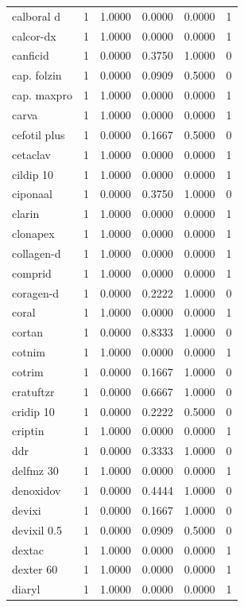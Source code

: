 \begin{longtable}{p{3.0cm}rrrrr}
calboral d & 1 & 1.0000 & 0.0000 & 0.0000 & 1 \\
calcor-dx & 1 & 1.0000 & 0.0000 & 0.0000 & 1 \\
canficid & 1 & 0.0000 & 0.3750 & 1.0000 & 0 \\
cap. folzin & 1 & 0.0000 & 0.0909 & 0.5000 & 0 \\
cap. maxpro & 1 & 1.0000 & 0.0000 & 0.0000 & 1 \\
carva & 1 & 1.0000 & 0.0000 & 0.0000 & 1 \\
cefotil plus & 1 & 0.0000 & 0.1667 & 0.5000 & 0 \\
cetaclav & 1 & 1.0000 & 0.0000 & 0.0000 & 1 \\
cildip 10 & 1 & 1.0000 & 0.0000 & 0.0000 & 1 \\
ciponaal & 1 & 0.0000 & 0.3750 & 1.0000 & 0 \\
clarin & 1 & 1.0000 & 0.0000 & 0.0000 & 1 \\
clonapex & 1 & 1.0000 & 0.0000 & 0.0000 & 1 \\
collagen-d & 1 & 1.0000 & 0.0000 & 0.0000 & 1 \\
comprid & 1 & 1.0000 & 0.0000 & 0.0000 & 1 \\
coragen-d & 1 & 0.0000 & 0.2222 & 1.0000 & 0 \\
coral & 1 & 1.0000 & 0.0000 & 0.0000 & 1 \\
cortan & 1 & 0.0000 & 0.8333 & 1.0000 & 0 \\
cotnim & 1 & 1.0000 & 0.0000 & 0.0000 & 1 \\
cotrim & 1 & 0.0000 & 0.1667 & 1.0000 & 0 \\
cratuftzr & 1 & 0.0000 & 0.6667 & 1.0000 & 0 \\
cridip 10 & 1 & 0.0000 & 0.2222 & 0.5000 & 0 \\
criptin & 1 & 1.0000 & 0.0000 & 0.0000 & 1 \\
ddr & 1 & 0.0000 & 0.3333 & 1.0000 & 0 \\
delfmz 30 & 1 & 1.0000 & 0.0000 & 0.0000 & 1 \\
denoxidov & 1 & 0.0000 & 0.4444 & 1.0000 & 0 \\
devixi & 1 & 0.0000 & 0.1667 & 1.0000 & 0 \\
devixil 0.5 & 1 & 0.0000 & 0.0909 & 0.5000 & 0 \\
dextac & 1 & 1.0000 & 0.0000 & 0.0000 & 1 \\
dexter 60 & 1 & 1.0000 & 0.0000 & 0.0000 & 1 \\
diaryl & 1 & 1.0000 & 0.0000 & 0.0000 & 1 \\

\end{longtable}
